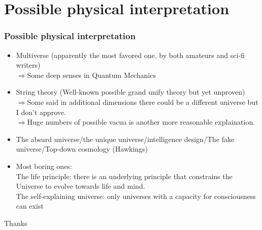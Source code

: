 \documentclass[8pt]{beamer}
\newcommand{\phanitem}{\phantom{\item}}
\begin{document}
\section{Possible physical interpretation}
\begin{frame}
  \frametitle{Possible physical interpretation}
  \begin{itemize}
    \item Multiverse (apparently the most favored one, by both amateurs and sci-fi writers)\\
    $\Longrightarrow$Some deep senses in Quantum Mechanics
    \phantom{\item }
    \item String theory (Well-known possible grand unify theory but yet unproven)\\
    $\Longrightarrow$Some said in additional dimensions there could be a different universe but I don't approve.\\
    $\Longrightarrow$Huge numbers of possible vacua is another more reasonable explaination.
    \phanitem
    \item The absurd universe/the unique universe/intelligence design/The fake universe/Top-down cosmology (Hawkings)
    \phanitem
    \item Most boring ones: \\
    The life principle: there is an underlying principle that constrains the Universe to evolve towards life and mind.\\The self-explaining universe: only universes with a capacity for consciousness can exist
  \end{itemize}
\end{frame}



\begin{frame}
  \Huge
  \begin{center}
    Thanks
  \end{center}
\end{frame}
\end{document}
